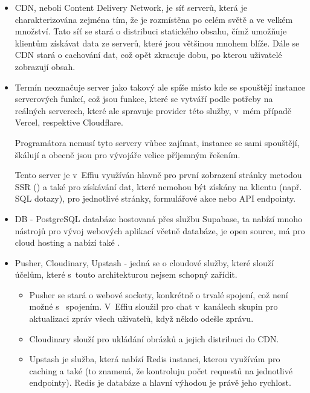 \documentclass[12pt, a4paper,
openright
]{report}
\begin{document}
	\begin{itemize}
		\item CDN, neboli Content Delivery Network, je síť serverů, která je charakterizována zejména tím, že je rozmístěna po celém světě a ve velkém množství. Tato síť se stará o distribuci statického obsahu, čímž umožňuje klientům získávat data ze serverů, které jsou většinou mnohem blíže. Dále se CDN stará o cachování dat, což opět zkracuje dobu, po kterou uživatelé zobrazují obsah.
		\item Termín  neoznačuje server jako takový ale spíše místo kde se spouštějí instance serverových funkcí, což jsou funkce, které se vytváří podle potřeby na reálných serverech, které ale spravuje provider této služby, v~mém případě Vercel, respektive Cloudflare.
		
		Programátora nemusí tyto servery vůbec zajímat, instance se sami spouštějí, škálují a obecně jsou pro vývojáře velice příjemným řešením.
		
		Tento server je v~Effiu využíván hlavně pro první zobrazení stránky metodou SSR () a také pro získávání dat, které nemohou být získány na klientu (např. SQL dotazy), pro jednotlivé stránky, formulářové akce nebo API endpointy.
		
		\item DB - PostgreSQL databáze hostovaná přes službu Supabase, ta nabízí mnoho nástrojů pro vývoj webových aplikací včetně databáze, je open source, má  pro cloud hosting a nabízí také .
		\item Pusher, Cloudinary, Upstash - jedná se o cloudové služby, které slouží účelům, které s~touto architekturou nejsem schopný zařídit.

		\begin{itemize}
			\item Pusher se stará o webové sockety, konkrétně o trvalé spojení, což není možné s~ spojením. V~Effiu sloužil pro chat v~kanálech skupin pro aktualizaci zpráv všech uživatelů, když někdo odešle zprávu.
			
			\item Cloudinary slouží pro ukládání obrázků a jejich distribuci do CDN.
			
			\item Upstash je služba, která nabízí Redis instanci, kterou využívám pro caching a také  (to znamená, že kontroluju počet requestů na jednotlivé endpointy). Redis je  databáze a hlavní výhodou je právě jeho rychlost.
		\end{itemize}
	\end{itemize}
\end{document}
